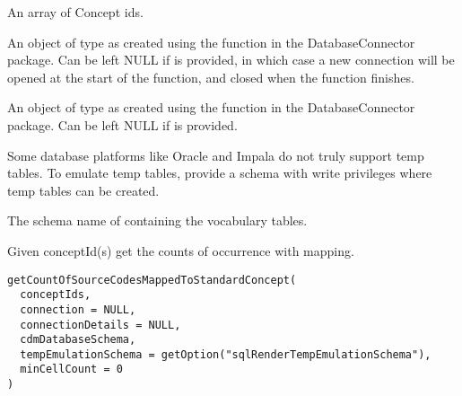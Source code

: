 \documentclass[a4paper]{book}
\begin{document}
\begin{Arguments}
\begin{ldescription}
\item[\code{conceptIds}] An array of Concept ids.

\item[\code{connection}] An object of type  as created using the
 function in the
DatabaseConnector package. Can be left NULL if 
is provided, in which case a new connection will be opened at the start
of the function, and closed when the function finishes.

\item[\code{connectionDetails}] An object of type  as created using the
 function in the
DatabaseConnector package. Can be left NULL if  is
provided.

\item[\code{tempEmulationSchema}] Some database platforms like Oracle and Impala do not truly support temp tables. To emulate temp 
tables, provide a schema with write privileges where temp tables can be created.

\item[\code{vocabularyDatabaseSchema}] The schema name of containing the vocabulary tables.
\end{ldescription}
\end{Arguments}
%
\begin{Description}\relax
Given conceptId(s) get the counts of occurrence with mapping.
\end{Description}
%
\begin{Usage}
\begin{verbatim}
getCountOfSourceCodesMappedToStandardConcept(
  conceptIds,
  connection = NULL,
  connectionDetails = NULL,
  cdmDatabaseSchema,
  tempEmulationSchema = getOption("sqlRenderTempEmulationSchema"),
  minCellCount = 0
)
\end{verbatim}
\end{Usage}
%
\end{document}
